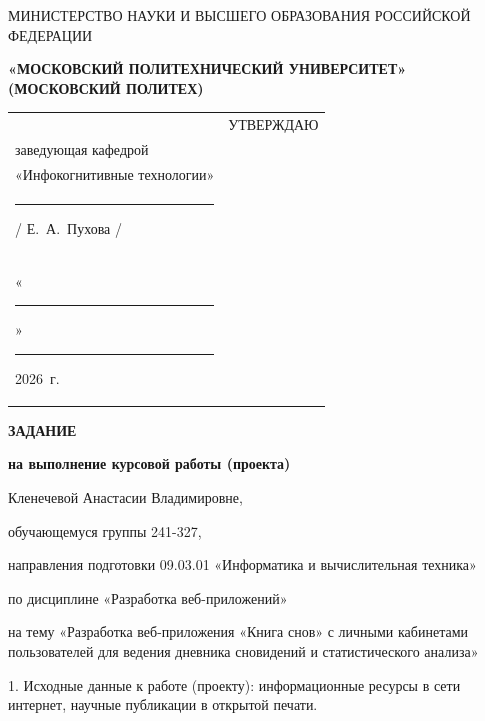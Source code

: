 \documentclass[14pt, a4paper]{extarticle}
\begin{document}
\pagestyle{empty}


\begin{center}
    {\small МИНИСТЕРСТВО НАУКИ И ВЫСШЕГО ОБРАЗОВАНИЯ РОССИЙСКОЙ ФЕДЕРАЦИИ}


    {\small \textbf{«МОСКОВСКИЙ ПОЛИТЕХНИЧЕСКИЙ УНИВЕРСИТЕТ»}} \\
    {\small \textbf{(МОСКОВСКИЙ ПОЛИТЕХ)}}
\end{center}

\begin{tabularx}{\textwidth}{@{} p{} p{} @{}}
     &
    \raggedright
    УТВЕРЖДАЮ                          \\
    заведующая кафедрой                \\
    «Инфокогнитивные технологии»       \\[0.3cm]

    \rule{3cm}{0.4pt} / Е.~А.~Пухова / \\[0.1cm]

    «\rule{0.8cm}{0.4pt}» \rule{3cm}{0.4pt} 2026~г.
\end{tabularx}


\begin{center}

    { \large \textbf{ЗАДАНИЕ}}

    \textbf{на выполнение курсовой работы (проекта)}

    Кленечевой Анастасии Владимировне, %

\end{center}

обучающемуся группы 241-327,

направления подготовки 09.03.01 «Информатика и вычислительная техника»

по дисциплине «Разработка веб-приложений»

на тему «Разработка веб-приложения «Книга снов» с личными кабинетами пользователей для ведения дневника сновидений и статистического анализа»

1. Исходные данные к работе (проекту): информационные ресурсы в сети
интернет, научные публикации в открытой печати.
\end{document}
